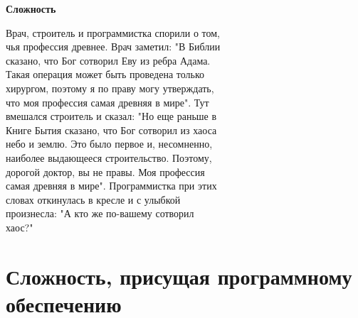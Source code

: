 \documentclass[a4paper,12pt]{article}
\begin{document}
\begin{center}
\begin{LARGE}
\textbf{Сложность}\\
\end{LARGE}
\end{center}

\footnotesize{ 
\hspace*{7.2 cm}
%
Врач, строитель и программистка спорили о том,\\\hspace*{7.94 cm}чья профессия древнее. Врач заметил: "В Библии \\\hspace*{7.94 cm}сказано, что Бог сотворил Еву из ребра Адама.\\\hspace*{7.94 cm}Такая операция может быть проведена только\\\hspace*{7.94 cm}хирургом, поэтому я по праву могу утверждать,\\\hspace*{7.94 cm}что моя профессия самая древняя в мире". Тут\\\hspace*{7.94 cm}вмешался строитель и сказал: "Но еще раньше в\\\hspace*{7.94 cm}Книге Бытия сказано, что Бог сотворил из хаоса\\\hspace*{7.94 cm}небо и землю. Это было первое и, несомненно,\\\hspace*{7.94 cm}наиболее выдающееся строительство. Поэтому,\\\hspace*{7.94 cm}дорогой доктор, вы не правы. Моя профессия\\\hspace*{7.94 cm}самая древняя в мире". Программистка при этих\\\hspace*{7.94 cm}словах откинулась в кресле и с улыбкой\\\hspace*{7.94 cm}произнесла: "А кто же по-вашему сотворил\\\hspace*{7.94 cm}хаос?" \\
}
\section{Сложность, присущая программному обеспечению }
\end{document}

